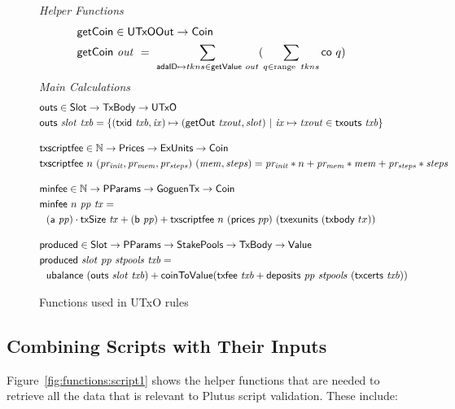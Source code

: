 \begin{figure}[htb]
  \emph{Helper Functions}
  \begin{align*}
    & \mathsf{getCoin} \in \mathsf{UTxOOut} \to \mathsf{Coin} \\
    & \mathsf{getCoin}~{\mathit{out}} ~=~\sum_{\mathsf{adaID} \mapsto tkns \in \mathsf{getValue}~out}
       (\sum_{q \in \operatorname{range}~{tkns}} \mathsf{co}~q)
  \end{align*}
  \emph{Main Calculations}
  \begin{align*}
    & \fun{outs} \in \Slot \to \TxBody \to \UTxO \\
    & \fun{outs} ~ \var{slot}~\var{txb} =
        \left\{
          (\fun{txid} ~ \var{txb}, \var{ix}) \mapsto (\fun{getOut}~\var{txout},\var{slot}) ~
          \middle|~
          \var{ix} \mapsto \var{txout} \in \txouts{txb}
        \right\}
    \nextdef
    & \fun{txscriptfee} \in \N \to \Prices \to \ExUnits \to \Coin \\
    & \fun{txscriptfee}~n~ (\var{pr_{init}, pr_{mem}, pr_{steps}})~ (\var{mem, steps})
    = \var{pr_{init}}*n + \var{pr_{mem}}*\var{mem} + \var{pr_{steps}}*\var{steps}
    \nextdef
    &\fun{minfee} \in \N \to \PParams \to \GoguenTx \to \Coin \\
    &\fun{minfee}  ~n~\var{pp}~\var{tx} = \\
    &~~(\fun{a}~\var{pp}) \cdot \fun{txSize}~\var{tx} + (\fun{b}~\var{pp}) +
    \fun{txscriptfee}~n~(\fun{prices}~{pp})~(\fun{txexunits}~(\fun{txbody}~{tx}))
    \nextdef
    & \fun{produced} \in \Slot \to \PParams \to \StakePools \to \TxBody \to \Value \\
    & \fun{produced}~\var{slot}~\var{pp}~\var{stpools}~\var{txb} = \\
    &~~\ubalance{(\outs{slot}~{txb})} + \fun{coinToValue}(\txfee{txb} + \deposits{pp}{stpools}~{(\txcerts{txb})})
  \end{align*}
  \caption{Functions used in UTxO rules}
  \label{fig:functions:utxo}
\end{figure}

\subsection{Combining Scripts with Their Inputs}
\label{sec:scripts-inputs}

Figure~\ref{fig:functions:script1} shows the helper functions that are needed to
retrieve all the data that is relevant to Plutus script validation.
These include:

